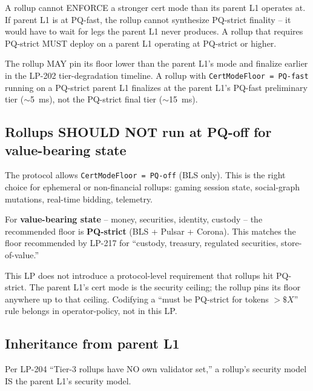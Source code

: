 A rollup cannot ENFORCE a stronger cert mode than its parent L1
operates at. If parent L1 is at PQ-fast, the rollup cannot
synthesize PQ-strict finality -- it would have to wait for legs
the parent L1 never produces. A rollup that requires PQ-strict
MUST deploy on a parent L1 operating at PQ-strict or higher.

The rollup MAY pin its floor lower than the parent L1's mode and
finalize earlier in the LP-202 tier-degradation timeline. A rollup
with \texttt{CertModeFloor = PQ-fast} running on a PQ-strict
parent L1 finalizes at the parent L1's PQ-fast preliminary tier
($\sim$\SI{5}{\milli\second}), not the PQ-strict final tier
($\sim$\SI{15}{\milli\second}).

\subsection{Rollups SHOULD NOT run at PQ-off for value-bearing state}

The protocol allows \texttt{CertModeFloor = PQ-off} (BLS only).
This is the right choice for ephemeral or non-financial rollups:
gaming session state, social-graph mutations, real-time bidding,
telemetry.

For \textbf{value-bearing state} -- money, securities, identity,
custody -- the recommended floor is \textbf{PQ-strict} (BLS + Pulsar +
Corona). This matches the floor recommended by LP-217 for
``custody, treasury, regulated securities, store-of-value.''

This LP does not introduce a protocol-level requirement that
rollups hit PQ-strict. The parent L1's cert mode is the security
ceiling; the rollup pins its floor anywhere up to that ceiling.
Codifying a ``must be PQ-strict for tokens $> \$X$'' rule belongs
in operator-policy, not in this LP.

\subsection{Inheritance from parent L1}

Per LP-204 ``Tier-3 rollups have NO own validator set,'' a rollup's
security model IS the parent L1's security model.

